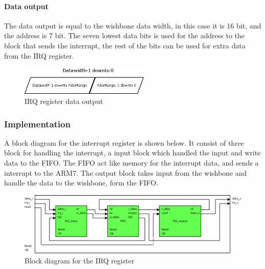 \paragraph{Data output}
The data output is equal to the wishbone data width, in this case it is 16 bit, and the address is 7 bit. The seven lowest data bits is used for the address to the block that sends the interrupt, the rest of the bits can be used for extra data from the IRQ register.
\begin{figure}[H]
	\begin{centering}
		\includegraphics[width=0.55\textwidth]{images/tb5_irq_reg_data_o.png}
		\caption{IRQ register data output}
	\end{centering}
\end{figure}
%
%
\subsubsection{Implementation}
A block diagram for the interrupt register is shown below. It consist of three block for handling the interrupt, a input block which handled the input and write data to the FIFO. The FIFO act like memory for the interrupt data, and sends a interrupt to the ARM7. The output block takes input from the wishbone and handle the data to the wishbone, form the FIFO.
\begin{figure}[H]
	\begin{centering}
		\includegraphics[width=1\textwidth]{images/irq_reg_block_dia.png}
		\caption{Block diagram for the IRQ register}
	\end{centering}
\end{figure}

